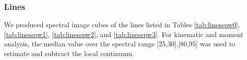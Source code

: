 \documentclass{aa}
\begin{document}
\subsubsection{Lines}
\label{sec:obslines}
We produced spectral image cubes of the lines listed in Tables
\ref{tab:linesspw0}, \ref{tab:linesspw1}, \ref{tab:linesspw2}, and
\ref{tab:linesspw3}.  For kinematic and moment analysis, the median value over
the spectral range [25,30],[80,95] \kms was used to estimate and subtract the
local continuum. 












% 
\end{document}
